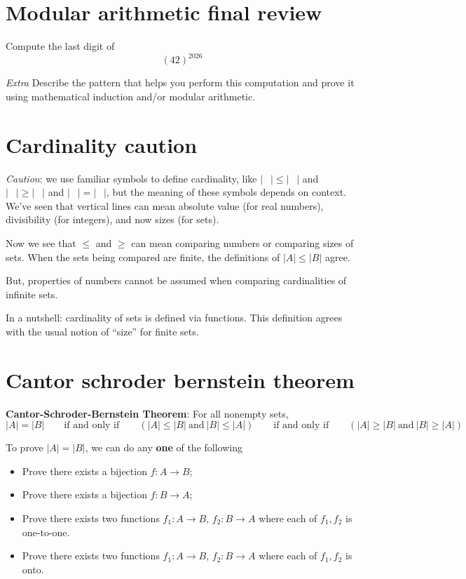 \documentclass[12pt, oneside]{article}
\begin{document}
\vspace{200pt} \vfill
\section*{Modular arithmetic final review}


Compute the last digit of 
\[
    (42)^{2026}
\]

\vfill

{\it Extra} Describe the pattern that helps you perform this computation 
and prove it using mathematical induction and/or modular arithmetic. \vfill
\section*{Cardinality caution}


{\it Caution}: we use 
familiar symbols to define cardinality, like
$| \phantom{\cdots} | \leq | \phantom{\cdots} |$
and 
$| \phantom{\cdots} | \geq | \phantom{\cdots} |$
and 
$| \phantom{\cdots} | = | \phantom{\cdots} |$, 
but the meaning of these symbols depends on context.
We've seen that vertical lines can mean absolute
value (for real numbers), divisibility (for integers), 
and now sizes (for sets). 

Now we see that $\leq$ and $\geq$ can mean comparing
numbers or comparing sizes of sets. When the sets being 
compared are finite, the definitions 
of $|A| \leq |B|$ agree. 

But, properties of numbers cannot be assumed when comparing
cardinalities of infinite sets.

In a nutshell: cardinality of sets is defined via functions.
This definition agrees with the usual notion of ``size'' for 
finite sets. \vfill
\section*{Cantor schroder bernstein theorem}


{\bf Cantor-Schroder-Bernstein Theorem}: For all nonempty sets,
\[
|A| = |B| \qquad\text{if and only if} \qquad (|A| \leq |B| ~\text{and}~ |B| \leq |A|)
\qquad\text{if and only if} \qquad (|A| \geq |B| ~\text{and}~ |B| \geq |A|)
\]

To prove $|A| = |B|$,  we can do any {\bf one} of the following

\begin{itemize}\setlength{\itemsep}{-5pt}
\item Prove there exists  a bijection $f:  A \to B$;
\item Prove there exists a  bijection  $f: B  \to  A$;
\item Prove there exists two functions $f_1: A \to B$, $f_2: B \to  A$ where each of $f_1, f_2$ is one-to-one.
\item Prove there exists two functions $f_1: A \to B$, $f_2: B \to  A$ where each of $f_1, f_2$ is onto.
\end{itemize} \vfill
\end{document}
